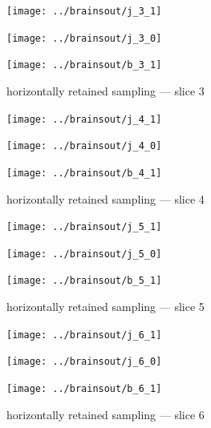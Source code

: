 \documentclass{article}
\begin{document}
\begin{figure}
\begin{centering}

\parbox{\imsize}{\texttt{[image: ../brainsout/j\_3\_1]}}

\vspace{\vertsep}

\parbox{\imsize}{\texttt{[image: ../brainsout/j\_3\_0]}}

\vspace{\vertsep}

\parbox{\imsize}{\texttt{[image: ../brainsout/b\_3\_1]}}

\end{centering}
\caption{horizontally retained sampling --- slice 3}
\end{figure}


\begin{figure}
\begin{centering}

\parbox{\imsize}{\texttt{[image: ../brainsout/j\_4\_1]}}

\vspace{\vertsep}

\parbox{\imsize}{\texttt{[image: ../brainsout/j\_4\_0]}}

\vspace{\vertsep}

\parbox{\imsize}{\texttt{[image: ../brainsout/b\_4\_1]}}

\end{centering}
\caption{horizontally retained sampling --- slice 4}
\end{figure}


\begin{figure}
\begin{centering}

\parbox{\imsize}{\texttt{[image: ../brainsout/j\_5\_1]}}

\vspace{\vertsep}

\parbox{\imsize}{\texttt{[image: ../brainsout/j\_5\_0]}}

\vspace{\vertsep}

\parbox{\imsize}{\texttt{[image: ../brainsout/b\_5\_1]}}

\end{centering}
\caption{horizontally retained sampling --- slice 5}
\end{figure}


\begin{figure}
\begin{centering}

\parbox{\imsize}{\texttt{[image: ../brainsout/j\_6\_1]}}

\vspace{\vertsep}

\parbox{\imsize}{\texttt{[image: ../brainsout/j\_6\_0]}}

\vspace{\vertsep}

\parbox{\imsize}{\texttt{[image: ../brainsout/b\_6\_1]}}

\end{centering}
\caption{horizontally retained sampling --- slice 6}
\end{figure}
\end{document}
